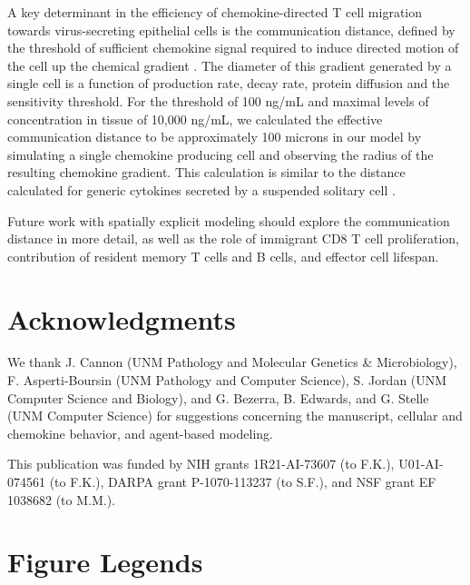 \documentclass[10pt]{article}
\begin{document}
A key determinant in the efficiency of chemokine-directed T cell migration towards virus-secreting epithelial cells is the communication distance, defined by the threshold of sufficient chemokine signal required to induce directed motion of the cell up the chemical gradient \cite{Thelen2008}.  The diameter of this gradient generated by a single cell is a function of production rate, decay rate, protein diffusion and the sensitivity threshold.  For the threshold of 100 ng/mL and maximal levels of concentration in tissue of 10,000 ng/mL, we calculated the effective communication distance to be approximately 100 microns in our model by simulating a single chemokine producing cell and observing the radius of the resulting chemokine gradient.  This calculation is similar to the distance calculated for generic cytokines secreted by a suspended solitary cell \cite{Francis1997}.  

Future work with spatially explicit modeling should explore the communication distance in more detail, as well as the role of immigrant CD8 T cell proliferation, contribution of resident memory T cells and B cells, and effector cell lifespan. 


\section*{Acknowledgments}

We thank J. Cannon (UNM Pathology and Molecular Genetics \& Microbiology), F. Asperti-Boursin (UNM Pathology and Computer Science), S. Jordan (UNM Computer Science and Biology), and G. Bezerra, B. Edwards, and G. Stelle (UNM Computer Science) for suggestions concerning the manuscript, cellular and chemokine behavior, and agent-based modeling.

This publication was funded by NIH grants 1R21-AI-73607 (to F.K.), U01-AI-074561 (to F.K.), DARPA grant P-1070-113237 (to S.F.), and NSF grant EF 1038682 (to M.M.).





\section*{Figure Legends}
\end{document}
